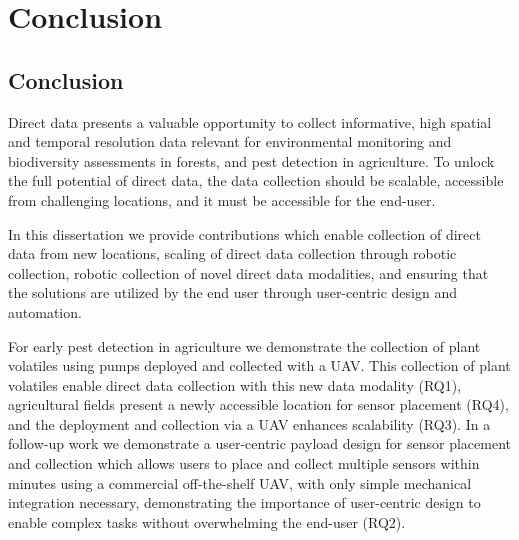 \chapter{Conclusion}
\label{ch:conclusion}

\section{Conclusion}


Direct data presents a valuable opportunity to collect informative, high spatial and temporal resolution data relevant for environmental monitoring and biodiversity assessments in forests, and pest detection in agriculture. To unlock the full potential of direct data, the data collection should be scalable, accessible from challenging locations, and it must be accessible for the end-user.

In this dissertation we provide contributions which enable collection of direct data from new locations, scaling of direct data collection through robotic collection, robotic collection of novel direct data modalities, and ensuring that the solutions are utilized by the end user through user-centric design and automation.




For early pest detection in agriculture we demonstrate the collection of plant volatiles using pumps deployed and collected with a UAV. This collection of plant volatiles enable direct data collection with this new data modality (RQ1), agricultural fields present a newly accessible location for sensor placement (RQ4), and the deployment and collection via a UAV enhances scalability (RQ3). In a follow-up work we demonstrate a user-centric payload design for sensor placement and collection which allows users to place and collect multiple sensors within minutes using a commercial off-the-shelf UAV, with only simple mechanical integration necessary, demonstrating the importance of user-centric design to enable complex tasks without overwhelming the end-user (RQ2). 

